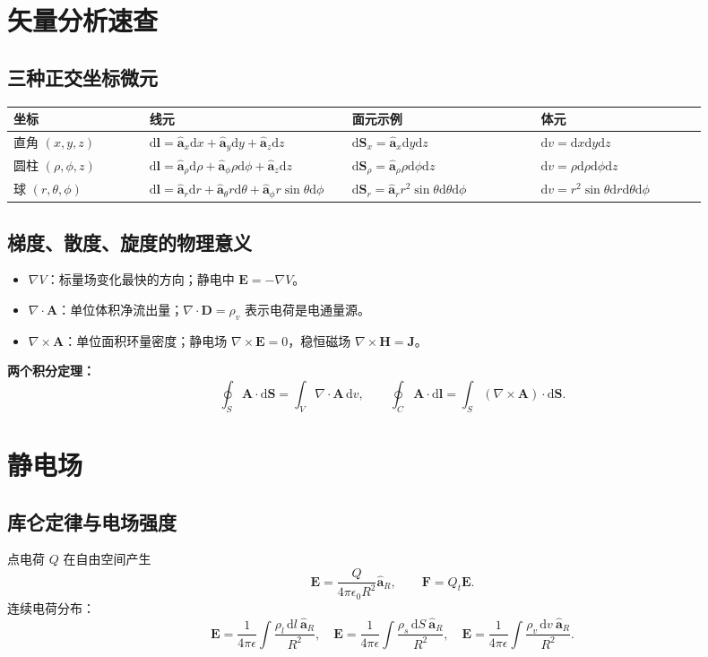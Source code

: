 \documentclass[11pt,a4paper]{ctexart}
\newcommand{\dd}{\mathrm{d}}
\newcommand{\uv}[1]{\hat{\bm a}_{#1}}
\newcommand{\E}{\bm E}
\newcommand{\D}{\bm D}
\newcommand{\Hf}{\bm H}
\newcommand{\J}{\bm J}
\newcommand{\A}{\bm A}
\newcommand{\curl}{\nabla\times}
\newcommand{\divg}{\nabla\cdot}
\newcommand{\grad}{\nabla}
\begin{document}
\section{矢量分析速查}
\subsection{三种正交坐标微元}
\begin{longtable}{p{0.18\linewidth}p{0.25\linewidth}p{0.25\linewidth}p{0.22\linewidth}}
\toprule
坐标 & 线元 & 面元示例 & 体元 \\
\midrule
直角 $(x,y,z)$ &
$\dd \bm l=\uv{x}\dd x+\uv{y}\dd y+\uv{z}\dd z$ &
$\dd \bm S_x=\uv{x}\dd y\dd z$ &
$\dd v=\dd x\dd y\dd z$ \\
圆柱 $(\rho,\phi,z)$ &
$\dd \bm l=\uv{\rho}\dd\rho+\uv{\phi}\rho\dd\phi+\uv{z}\dd z$ &
$\dd \bm S_\rho=\uv{\rho}\rho\dd\phi\dd z$ &
$\dd v=\rho\dd\rho\dd\phi\dd z$ \\
球 $(r,\theta,\phi)$ &
$\dd \bm l=\uv{r}\dd r+\uv{\theta}r\dd\theta+\uv{\phi}r\sin\theta\dd\phi$ &
$\dd \bm S_r=\uv{r}r^2\sin\theta\dd\theta\dd\phi$ &
$\dd v=r^2\sin\theta\dd r\dd\theta\dd\phi$ \\
\bottomrule
\end{longtable}

\subsection{梯度、散度、旋度的物理意义}
\begin{itemize}
\item $\grad V$：标量场变化最快的方向；静电中 $\E=-\grad V$。
\item $\divg \A$：单位体积净流出量；$\divg\D=\rho_v$ 表示电荷是电通量源。
\item $\curl \A$：单位面积环量密度；静电场 $\curl\E=0$，稳恒磁场 $\curl\Hf=\J$。
\end{itemize}

\textbf{两个积分定理：}
\[
\oint_S \A\cdot \dd\bm S=\int_V \divg\A\,\dd v,\qquad
\oint_C \A\cdot \dd\bm l=\int_S(\curl\A)\cdot\dd\bm S .
\]

\section{静电场}
\subsection{库仑定律与电场强度}
点电荷 $Q$ 在自由空间产生
\[
\E=\frac{Q}{4\pi\epsilon_0R^2}\uv{R},\qquad
\bm F=Q_t\E .
\]
连续电荷分布：
\[
\E=\frac{1}{4\pi\epsilon}\int \frac{\rho_l\,\dd l\ \uv R}{R^2},\quad
\E=\frac{1}{4\pi\epsilon}\int \frac{\rho_s\,\dd S\ \uv R}{R^2},\quad
\E=\frac{1}{4\pi\epsilon}\int \frac{\rho_v\,\dd v\ \uv R}{R^2}.
\]
\end{document}
